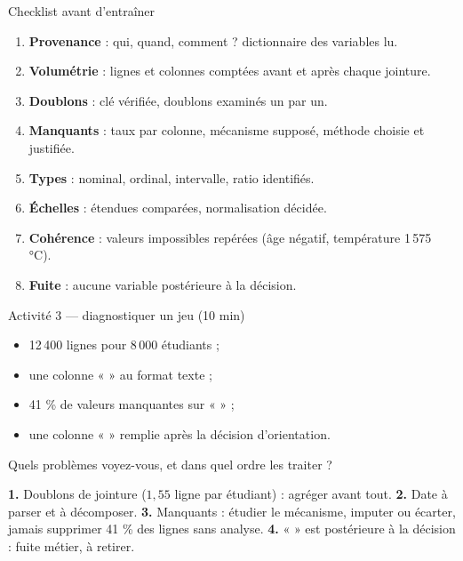 \begin{frame}{Checklist avant d'entraîner}
\begin{enumerate}
  \item \textbf{Provenance} : qui, quand, comment ? dictionnaire des variables lu.
  \item \textbf{Volumétrie} : lignes et colonnes comptées avant et après chaque
        jointure.
  \item \textbf{Doublons} : clé vérifiée, doublons examinés un par un.
  \item \textbf{Manquants} : taux par colonne, mécanisme supposé, méthode choisie
        et justifiée.
  \item \textbf{Types} : nominal, ordinal, intervalle, ratio identifiés.
  \item \textbf{Échelles} : étendues comparées, normalisation décidée.
  \item \textbf{Cohérence} : valeurs impossibles repérées (âge négatif,
        température 1\,575 °C).
  \item \textbf{Fuite} : aucune variable postérieure à la décision.
\end{enumerate}
\end{frame}

\begin{frame}{Activité 3 --- diagnostiquer un jeu (10 min)}
\begin{abox}
\begin{itemize}
  \item 12\,400 lignes pour 8\,000 étudiants ;
  \item une colonne «  » au format texte ;
  \item 41 \% de valeurs manquantes sur «  » ;
  \item une colonne «  » remplie après la décision
        d'orientation.
\end{itemize}
Quels problèmes voyez-vous, et dans quel ordre les traiter ?
\end{abox}
\vspace{1mm}
\begin{solbox}
\textbf{1.} Doublons de jointure ($1{,}55$ ligne par étudiant) : agréger avant
tout. \textbf{2.} Date à parser et à décomposer. \textbf{3.} Manquants :
étudier le mécanisme, imputer ou écarter, jamais supprimer 41 \% des lignes
sans analyse. \textbf{4.} «  » est postérieure à la décision :
fuite métier, à retirer.
\end{solbox}
\end{frame}

